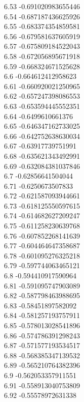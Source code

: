 {6.53	-0.691020983655446\\
6.54	-0.687187436625926\\
6.55	-0.683374354859581\\
6.56	-0.679581637605919\\
6.57	-0.675809184522043\\
6.58	-0.672056895671918\\
6.59	-0.668324671525628\\
6.6	-0.664612412958623\\
6.61	-0.660920021250965\\
6.62	-0.657247398086553\\
6.63	-0.653594445552351\\
6.64	-0.6499610661376\\
6.65	-0.646347162733025\\
6.66	-0.642752638630034\\
6.67	-0.63917739751991\\
6.68	-0.635621343492991\\
6.69	-0.632084381037846\\
6.7	-0.62856641504044\\
6.71	-0.6250673507833\\
6.72	-0.621587093944661\\
6.73	-0.618125550597615\\
6.74	-0.614682627209247\\
6.75	-0.611258230639768\\
6.76	-0.607852268141639\\
6.77	-0.604464647358687\\
6.78	-0.601095276325218\\
6.79	-0.597744063465121\\
6.8	-0.594410917590964\\
6.81	-0.591095747903089\\
6.82	-0.587798463988695\\
6.83	-0.58451897582092\\
6.84	-0.581257193757911\\
6.85	-0.578013028541896\\
6.86	-0.574786391298243\\
6.87	-0.571577193534517\\
6.88	-0.568385347139532\\
6.89	-0.565210764382396\\
6.9	-0.562053357911551\\
6.91	-0.558913040753809\\
6.92	-0.55578972631338\\
}
